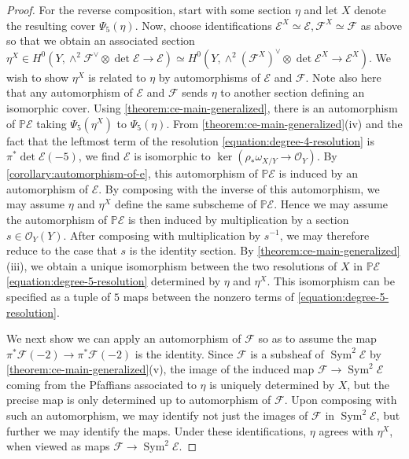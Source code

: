\documentclass[12 pt]{amsart}
\theoremstyle{plain}
\theoremstyle{definition}
\theoremstyle{remark}
\numberwithin{equation}{section}
\newcommand\bp{\mathbb P}
\newcommand\sce{\mathscr E}
\newcommand\scf{\mathscr F}
\newcommand\sco{\mathscr O}
\DeclareMathOperator\sym{Sym}
\begin{document}
\begin{proof}
	For the reverse composition, start with some section $\eta$ and let $X$
	denote the resulting cover $\Psi_5(\eta)$. 	
	Now, choose identifications
	$\sce^X \simeq \sce, \scf^X \simeq \scf$ as above
	so that we obtain an associated
	section $\eta^X \in H^0(Y,\wedge^2 \scf^\vee \otimes \det \sce \to \sce)
	\simeq H^0(Y, \wedge^2 (\scf^X)^\vee \otimes \det \sce^X \to \sce^X)$.
	We wish to show $\eta^X$ is related to $\eta$ by automorphisms of $\sce$ and
	$\scf$.  Note also here that any automorphism of $\sce$ and $\scf$ sends
	$\eta$ to another section defining an isomorphic cover.  
	Using
	\autoref{theorem:ce-main-generalized}, there is an automorphism of
	$\bp \sce$ taking $\Psi_5(\eta^X)$ to $\Psi_5(\eta)$.  
	From \autoref{theorem:ce-main-generalized}(iv) and the fact that the
	leftmost term of the resolution \eqref{equation:degree-4-resolution}
	is $\pi^* \det \sce(-5)$, we find $\sce$ is isomorphic to $\ker(\rho_*
	\omega_{X/Y} \to \sco_Y)$.
	By
	\autoref{corollary:automorphism-of-e}, this automorphism of $\bp \sce$ is induced by an
	automorphism of $\sce$.  By composing with the inverse of this
	automorphism, we may assume $\eta$ and $\eta^X$ define the same subscheme of $\bp
	\sce$. Hence we may assume the automorphism of $\bp \sce$ is then
	induced by multiplication by a section $s \in \sco_Y(Y)$.
	After composing with multiplication by $s^{-1}$, we may therefore reduce to
	the case that $s$ is the identity section.
	By \autoref{theorem:ce-main-generalized}(iii), we obtain a unique isomorphism
	between the two resolutions
	of $X$ in $\bp \sce$
	\eqref{equation:degree-5-resolution} determined by $\eta$ and
	$\eta^X$.
	This isomorphism can be specified as a tuple of $5$ maps between the
	nonzero terms
	of \eqref{equation:degree-5-resolution}.

	We next show we can apply an automorphism of $\scf$ so as to assume the
	map $\pi^* \scf(-2) \to \pi^* \scf(-2)$ is the identity.
	Since $\scf$ is a subsheaf of $\sym^2 \sce$ by
	\autoref{theorem:ce-main-generalized}(v), the image of the induced map
	$\scf \to \sym^2 \sce$ coming from the Pfaffians associated to $\eta$ is uniquely determined by $X$, 
	but the precise	map is only determined up to automorphism of $\scf$.  
	Upon composing with such an automorphism, 
	we may identify not just the images of $\scf$
	in $\sym^2 \sce$, but further we may identify the maps.  
	Under these
	identifications, $\eta$ agrees with $\eta^X$, when viewed as maps $\scf
	\to \sym^2 \sce$.


\end{proof}
\end{document}
